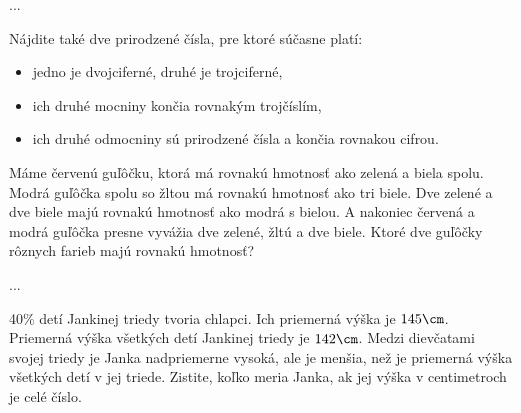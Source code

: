 {%
...}

{%
Nájdite také dve prirodzené čísla, pre ktoré súčasne platí:
\begin{itemize}
\item jedno je dvojciferné, druhé je trojciferné,
\item ich druhé mocniny končia rovnakým trojčíslím,
\item ich druhé odmocniny sú prirodzené čísla a končia rovnakou cifrou.
\end{itemize}
}

{%
Máme červenú guľôčku, ktorá má rovnakú hmotnosť ako zelená a biela spolu. Modrá guľôčka spolu so žltou
má rovnakú hmotnosť ako tri biele. Dve zelené a dve biele majú rovnakú hmotnosť ako modrá s bielou.
A nakoniec červená a modrá guľôčka presne vyvážia dve zelené, žltú a dve biele. Ktoré dve guľôčky rôznych
farieb majú rovnakú hmotnosť?}

{%
...}

{%
40\% detí Jankinej triedy tvoria chlapci. Ich priemerná výška je $145\cm$. Priemerná výška všetkých detí Jankinej
triedy je $142\cm$. Medzi dievčatami svojej triedy je Janka nadpriemerne vysoká, ale je menšia, než je priemerná
výška všetkých detí v jej triede. Zistite, koľko meria Janka, ak jej výška v centimetroch je celé číslo.}

